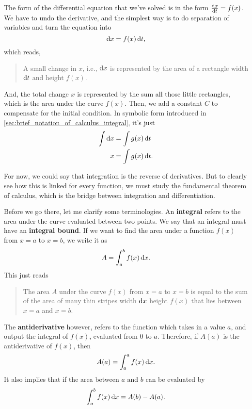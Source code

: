 The form of the differential equation that we've solved is in the form $\odv{x}{t} = f(x)$. We have to undo the derivative, and the simplest way is to do separation of variables and turn the equation into
\begin{equation}
    \odif{x} = f(x)\odif{t},
\end{equation}
which reads,
\begin{quotation}
    A small change in $x$, i.e., $\odif{x}$ is represented by the area of a rectangle width $\odif{t}$ and height $f(x)$.
\end{quotation}
And, the total change $x$ is represented by the sum all those little rectangles, which is the area under the curve $f(x)$. Then, we add a constant $C$ to compensate for the initial condition. In symbolic form introduced in \cref{sec:brief_notation_of_calculus_integral}, it's just
\begin{align}
    \int\odif{x} &= \int g(x)\odif{t} \\
    x &= \int g(x)\odif{t}.
\end{align}

For now, we could say that integration is the reverse of derivatives. But to clearly see how this is linked for every function, we must study the fundamental theorem of calculus, which is the bridge between integration and differentiation.

Before we go there, let me clarify some terminologies. An \textbf{integral} refers to the area under the curve evaluated between two points. We say that an integral must have an \textbf{integral bound}. If we want to find the area under a function $f(x)$ from $x = a$ to $x = b$, we write it as
\begin{equation}
    A = \int_a^b f(x)\odif{x}.
\end{equation}
This just reads
\begin{quotation}
    The area $A$ under the curve $f(x)$ from $x = a$ to $x = b$ is equal to the sum of the area of many thin stripes width $\odif{x}$ height $f(x)$ that lies between $x = a$ and $x = b$.
\end{quotation}
The \textbf{antiderivative} however, refers to the function which takes in a value $a$, and output the integral of $f(x)$, evaluated from $0$ to $a$. Therefore, if $A(a)$ is the antiderivative of $f(x)$, then
\begin{equation}
    A(a) = \int_0^a f(x)\odif{x}.
\end{equation}
It also implies that if the area between $a$ and $b$ can be evaluated by
\begin{equation}
    \int_a^b f(x)\odif{x} = A(b) - A(a).
\end{equation}

